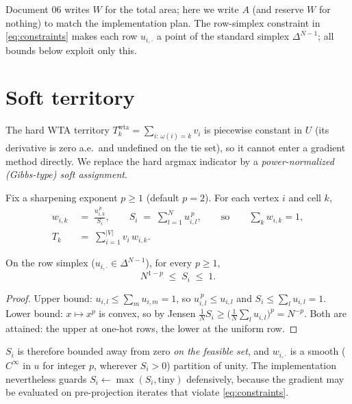 \documentclass[11pt,a4paper]{article}
\begin{document}
\begin{remark}
Document 06 writes $W$ for the total area; here we write $A$ (and reserve $W$
for nothing) to match the implementation plan. The row-simplex constraint in
\eqref{eq:constraints} makes each row $u_{i,\cdot}$ a point of the standard
simplex $\Delta^{N-1}$; all bounds below exploit only this.
\end{remark}

\section{Soft territory}
\label{sec:soft}

The hard WTA territory $T^{\mathrm{wta}}_k=\sum_{i:\,\omega(i)=k}v_i$ is
piecewise constant in $U$ (its derivative is zero a.e.\ and undefined on the
tie set), so it cannot enter a gradient method directly. We replace the hard
argmax indicator by a \emph{power-normalized (Gibbs-type) soft assignment}.

\begin{defn}
\label{defn:soft}
Fix a sharpening exponent $p\ge 1$ (default $p=2$). For each vertex $i$ and
cell $k$,
\begin{align}
  w_{i,k} &\;=\; \frac{u_{i,k}^{\,p}}{S_i},
  \qquad
  S_i \;=\; \sum_{l=1}^{N} u_{i,l}^{\,p},
  \qquad\text{so}\qquad
  \sum_k w_{i,k} = 1 ,
  \label{eq:weights}\\
  T_k &\;=\; \sum_{i=1}^{|V|} v_i\, w_{i,k}.
  \label{eq:softT}
\end{align}
\end{defn}

\begin{prop}
\label{prop:Sbounds}
On the row simplex ($u_{i,\cdot}\in\Delta^{N-1}$), for every $p\ge1$,
\begin{equation}
  N^{1-p} \;\le\; S_i \;\le\; 1 .
  \label{eq:Sbounds}
\end{equation}
\end{prop}

\begin{proof}
Upper bound: $u_{i,l}\le\sum_m u_{i,m}=1$, so
$u_{i,l}^{\,p}\le u_{i,l}$ and $S_i\le\sum_l u_{i,l}=1$.
Lower bound: $x\mapsto x^p$ is convex, so by Jensen
$\tfrac1N S_i \ge \bigl(\tfrac1N\sum_l u_{i,l}\bigr)^p = N^{-p}$.
Both are attained: the upper at one-hot rows, the lower at the uniform row.
\end{proof}

$S_i$ is therefore bounded away from zero \emph{on the feasible set}, and
$w_{i,\cdot}$ is a smooth ($C^\infty$ in $u$ for integer $p$, wherever
$S_i>0$) partition of unity. The implementation nevertheless guards
$S_i \leftarrow \max(S_i,\text{tiny})$ defensively, because the gradient may
be evaluated on pre-projection iterates that violate \eqref{eq:constraints}.
\end{document}
